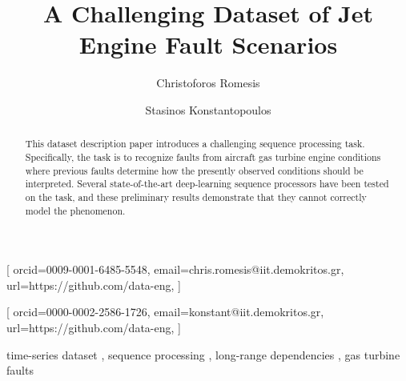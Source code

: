 \documentclass[twocolumn]{ceurart}
\begin{document}


\title{A Challenging Dataset of Jet Engine Fault Scenarios}


\author[1]{Christoforos Romesis}[%
orcid=0009-0001-6485-5548,
email=chris.romesis@iit.demokritos.gr,
url=https://github.com/data-eng,
]
\cormark[1]
\fnmark[1]

\author[1]{Stasinos Konstantopoulos}[%
orcid=0000-0002-2586-1726,
email=konstant@iit.demokritos.gr,
url=https://github.com/data-eng,
]
\fnmark[1]

\address[1]{Institute of Informatics and Telecommunications, NCSR Demokritos,
  Patr.Gregoriou E \& 27 Neapoleos Str, 15341 Agia Paraskevi, Greece}


\begin{abstract}
  This dataset description paper introduces a challenging sequence
  processing task. Specifically, the task is to recognize faults from
  aircraft gas turbine engine conditions where previous faults
  determine how the presently observed conditions should be
  interpreted. Several state-of-the-art deep-learning sequence
  processors have been tested on the task, and these preliminary
  results demonstrate that they cannot correctly model the phenomenon.
\end{abstract}

\begin{keywords}
  time-series dataset \sep
  sequence processing \sep
  long-range dependencies \sep
  gas turbine faults 
\end{keywords}

\maketitle
\end{document}
